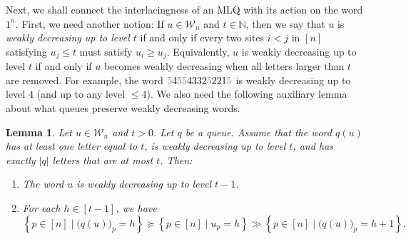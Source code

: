 \documentclass[reqno]{amsart}
\newcommand{\0}{\phantom{c}}
\newcommand{\mcW}{\mathcal{W}}
\newcommand{\NN}{\mathbb{N}}
\newcommand{\set}[1]{\left\{ #1 \right\}}
\newcommand{\abs}[1]{\left| #1 \right|}
\newcommand{\ive}[1]{\left[ #1 \right]}
\newcommand{\defn}[1]{{\color{darkred}\emph{#1}}} %
\theoremstyle{plain}
\newtheorem{lemma}[thm]{Lemma}
\theoremstyle{definition}
\numberwithin{equation}{section}
\begin{document}
Next, we shall connect the interlacingness of an MLQ with its action on the word $1^n$.
First, we need another notion:
If $u \in \mcW_n$ and $t \in \NN$, then we say that $u$ is \defn{weakly decreasing up to level $t$} if and only if every two sites $i < j$ in $\ive{n}$ satisfying $u_j \leq t$ must satisfy $u_i \geq u_j$.
Equivalently, $u$ is weakly decreasing up to level $t$ if and only if $u$ becomes weakly decreasing when all letters larger than $t$ are removed.
For example, the word ${\color{gray}5}4{\color{gray}55}4332{\color{gray}5}221{\color{gray}5}$ is weakly decreasing up to level $4$ (and up to any level $\leq 4$).
We also need the following auxiliary lemma about what queues preserve weakly decreasing words.

\begin{lemma}
\label{lem:determinant_form.interl-A}
Let $u \in \mcW_n$ and $t > 0$.
Let $q$ be a queue.
Assume that the word $q(u)$ has at least one letter equal to $t$, is weakly decreasing up to level $t$, and has exactly $\abs{q}$ letters that are at most $t$.
Then:

\begin{enumerate}
\item[(a)] The word $u$ is weakly decreasing up to level $t-1$.

\item[(b)] For each $h \in \ive{t-1}$, we have
\[
\set{ p \in \ive{n} \mid \bigl( q(u) \bigr)_p = h }
\succeq
\set{ p \in \ive{n} \mid u_p = h }
\gg
\set{ p \in \ive{n} \mid \bigl( q(u) \bigr)_p = h+1 } .
\]
\end{enumerate}
\end{lemma}
\end{document}
